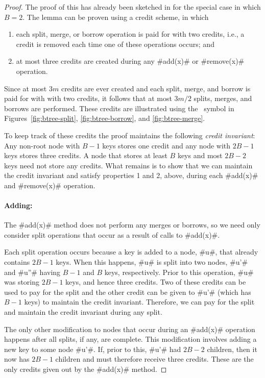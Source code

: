 \begin{proof}
   The proof of this has already been sketched in
    for the special case in which $B=2$.
   The lemma can be proven using a credit scheme,
   in which
  \begin{enumerate}
    \item each split, merge, or borrow operation is paid for with two
      credits, i.e., a credit is removed each time one of these operations
      occurs; and
    \item at most three credits are created during any #add(x)# or
      #remove(x)# operation.
  \end{enumerate}
  Since at most $3m$ credits are ever created and each split,
  merge, and borrow is paid for with with two credits, it follows
  that at most $3m/2$ splits, merges, and borrows are performed.
  These credits are illustrated using the \cent\ symbol in
  Figures~\ref{fig:btree-split}, \ref{fig:btree-borrow}, and
  \ref{fig:btree-merge}.

  To keep track of these credits the proof maintains the following
  \emph{credit invariant}:
  Any non-root node with $B-1$ keys stores one
  credit and any node with $2B-1$ keys stores three credits.  A node
  that stores at least $B$ keys and most $2B-2$ keys need not store
  any credits.  What remains is to show that we can maintain the credit
  invariant and satisfy properties 1 and 2, above, during each #add(x)#
  and #remove(x)# operation.

  \paragraph{Adding:}
  The #add(x)# method does not perform any merges or borrows, so we
  need only consider split operations that occur as a result of calls
  to #add(x)#.

  Each split operation occurs because a key is added to a node, #u#, that
  already contains $2B-1$ keys.  When this happens, #u# is split into two
  nodes, #u'# and #u''# having $B-1$ and $B$ keys, respectively.  Prior to
  this operation, #u# was storing $2B-1$ keys, and hence three credits.
  Two of these credits can be used to pay for the split and the other
  credit can be given to #u'# (which has $B-1$ keys) to maintain the
  credit invariant.  Therefore, we can pay for the split and maintain
  the credit invariant during any split.

  The only other modification to nodes that occur during an #add(x)#
  operation happens after all splits, if any, are complete.  This
  modification involves adding a new key to some node #u'#.  If, prior
  to this, #u'# had $2B-2$ children, then it now has $2B-1$ children and
  must therefore receive three credits.  These are the only credits given
  out by the #add(x)# method.


\end{proof}
